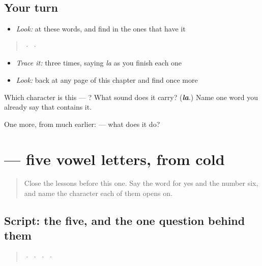 \subsection*{Your turn}
\begin{itemize}
\raggedright
  \item \emph{Look:} at these words, and find  in the ones that have it
\end{itemize}

\begin{quote}
  ·    ·  
\end{quote}

\begin{itemize}
\raggedright
  \item \emph{Trace it:}  three times, saying \emph{la} as you finish each one
  \item \emph{Look:} back at any page of this chapter and find  once more
\end{itemize}

\begin{tcolorbox}[breakable,colback=teal!4,colframe=teal!35!black,title={Before you move on}]
Which character is this — ? What sound does it carry? (\emph{\textbf{la}}.) Name one word you already say that contains it.

One more, from much earlier:  — what does it do?
\end{tcolorbox}
\section[\texorpdfstring{\te{ఐదు} \te{అచ్చులు} (aidu acchulu)}{ఐదు అచ్చులు (aidu acchulu)}]{  — five vowel letters, from cold}

\label{lesson:TE-S167-script-recall-vowels}



\begin{quote}
Close the lessons before this one. Say the word for yes and the number six, and name the character each of them opens on.
\end{quote}

\subsection*{Script: the five, and the one question behind them}
\begin{quote}
 ·  ·  ·  · 
\end{quote}

